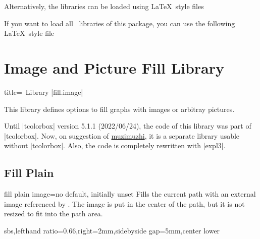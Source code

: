 \documentclass[a4paper,11pt]{article}
\begin{document}
Alternatively, the libraries can be loaded using \LaTeX\ style files
\begin{dispListing*}{}
\usepackage{tikzfill.***} %
\end{dispListing*}

If you want to load all \tikzname\ libraries of this package, you can use
the following \LaTeX\ style file
\begin{dispListing*}{}
\usepackage{tikzfill} %
\end{dispListing*}



\clearpage
\section{Image and Picture Fill Library}\label{sec:imagefill}%

\begin{dispListing*}{title=\tikzname\ Library |fill.image|}
\usetikzlibrary{fill.image} %
\usepackage{tikzfill.image} %
\end{dispListing*}

This library defines options to fill graphs with images or arbitray pictures.

Until |tcolorbox| version 5.1.1 (2022/06/24), the code of this library was part
of |tcolorbox|. Now, on suggestion of
\href{https://github.com/muzimuzhi}{muzimuzhi},
it is a separate library usable without |tcolorbox|. Also, the code is
completely rewritten with |expl3|.



\subsection{Fill Plain}
\begin{docTikzKey}{fill plain image}{=}{no default, initially unset}
  Fills the current path with an external image referenced by .
  The image is put in the center of the path, but it is not resized to fit into
  the path area.
\begin{dispExample*}{sbs,lefthand ratio=0.66,right=2mm,sidebyside gap=5mm,center lower}
\end{dispExample*}
\end{docTikzKey}
\end{document}
